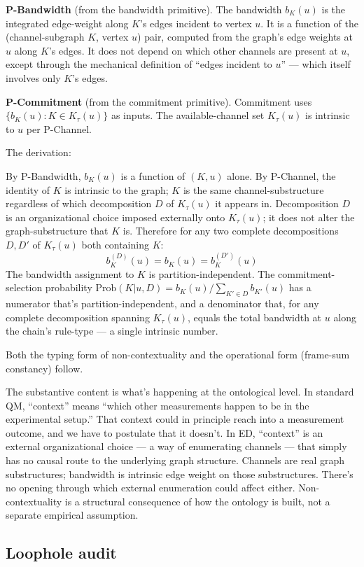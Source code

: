 \documentclass[11pt,a4paper]{article}
\begin{document}
\textbf{P-Bandwidth} (from the bandwidth primitive). The bandwidth $b_K(u)$ is the integrated edge-weight along $K$'s edges incident to vertex $u$. It is a function of the (channel-subgraph $K$, vertex $u$) pair, computed from the graph's edge weights at $u$ along $K$'s edges. It does not depend on which other channels are present at $u$, except through the mechanical definition of ``edges incident to $u$'' --- which itself involves only $K$'s edges.

\textbf{P-Commitment} (from the commitment primitive). Commitment uses $\{b_K(u) : K \in K_\tau(u)\}$ as inputs. The available-channel set $K_\tau(u)$ is intrinsic to $u$ per P-Channel.

The derivation:

By P-Bandwidth, $b_K(u)$ is a function of $(K, u)$ alone. By P-Channel, the identity of $K$ is intrinsic to the graph; $K$ is the same channel-substructure regardless of which decomposition $D$ of $K_\tau(u)$ it appears in. Decomposition $D$ is an organizational choice imposed externally onto $K_\tau(u)$; it does not alter the graph-substructure that $K$ is. Therefore for any two complete decompositions $D, D'$ of $K_\tau(u)$ both containing $K$:
\[
b^{(D)}_K(u) = b_K(u) = b^{(D')}_K(u)
\]
The bandwidth assignment to $K$ is partition-independent. The commitment-selection probability $\mathrm{Prob}(K | u, D) = b_K(u) / \sum_{K' \in D} b_{K'}(u)$ has a numerator that's partition-independent, and a denominator that, for any complete decomposition spanning $K_\tau(u)$, equals the total bandwidth at $u$ along the chain's rule-type --- a single intrinsic number.

Both the typing form of non-contextuality and the operational form (frame-sum constancy) follow.

The substantive content is what's happening at the ontological level. In standard QM, ``context'' means ``which other measurements happen to be in the experimental setup.'' That context could in principle reach into a measurement outcome, and we have to postulate that it doesn't. In ED, ``context'' is an external organizational choice --- a way of enumerating channels --- that simply has no causal route to the underlying graph structure. Channels are real graph substructures; bandwidth is intrinsic edge weight on those substructures. There's no opening through which external enumeration could affect either. Non-contextuality is a structural consequence of how the ontology is built, not a separate empirical assumption.

\subsection{Loophole audit}
\end{document}
